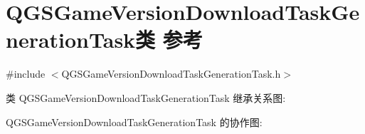 \hypertarget{class_q_g_s_game_version_download_task_generation_task}{}\section{Q\+G\+S\+Game\+Version\+Download\+Task\+Generation\+Task类 参考}
\label{class_q_g_s_game_version_download_task_generation_task}


{\ttfamily \#include $<$Q\+G\+S\+Game\+Version\+Download\+Task\+Generation\+Task.\+h$>$}



类 Q\+G\+S\+Game\+Version\+Download\+Task\+Generation\+Task 继承关系图\+:


Q\+G\+S\+Game\+Version\+Download\+Task\+Generation\+Task 的协作图\+:

